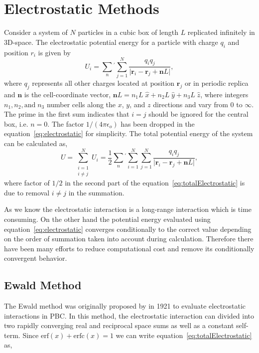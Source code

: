 \section{Electrostatic Methods}
\label{sec:ElectMethod}
Consider a system of $N$ particles in a cubic box of length $L$  replicated infinitely in 3D-space. The electrostatic potential energy for a particle with charge $q_i$ and position $r_i$ is given by
\begin{equation}
U_i =  \sum_n{}^{'}{ \sum_{j=1}^N {\frac{q_i q_j}{\lvert {\mathbf{r}_i-\mathbf{r}_j + \mathbf{n}L}\rvert}}},
\label{eq:electrostatic}
\end{equation}
where $q_j$ represents all other charges located at position $\mathbf{r}_j$ or in periodic replica and $\mathbf{n}$ is the cell-coordinate vector, $\mathbf{n}L = n_1 L \;\hat{x} + n_2 L\;\hat{y} + n_3 L\;\hat{z}$, where integers $n_1,n_2, \text{and}\; n_3$ number cells along the $x$, $y$, and $z$ directions and vary from 0 to $\infty$. The prime in the first sum indicates that $i =j $ should be ignored for the central box, i.e. $n = 0$. The factor ${1}/({4\pi\epsilon_o})$ has been dropped in the equation~\ref{eq:electrostatic} for simplicity. The total potential energy of the system can be calculated as,
\begin{equation}
U = \sum_{\substack{i=1 \\ i\neq j}}^N{U_i} = \frac{1}{2}\sum_n{}^{'}{\sum_{i=1}^N { \sum_{j=1}^N {\frac{q_i q_j}{\lvert {\mathbf{r}_i-\mathbf{r}_j + \mathbf{n}L}\rvert}}}},
\label{eq:totalElectrostatic}
\end{equation}
where factor of ${1}/{2}$ in the second part of the equation~\ref{eq:totalElectrostatic} is due to removal $i \neq j$ in the summation.
 
As we know the electrostatic interaction is a long-range interaction which is time consuming. On the other hand the potential energy evaluated using equation~\ref{eq:electrostatic} converges conditionally to the correct value depending on the order of summation taken into account during  calculation.\cite{Allen89} Therefore there have been many efforts to reduce computational cost and remove its conditionally convergent behavior.  

\subsection{Ewald Method}
The Ewald method was originally proposed by  in 1921 to evaluate electrostatic interactions in PBC. In this method, the electrostatic interaction  can divided into two rapidly converging real and reciprocal space sums as well as a constant self-term. \cite{Toukmaji96} Since  $\mathrm{erf}(x) + \mathrm{erfc}(x) = 1$ we can write equation~\ref{eq:totalElectrostatic} as,

